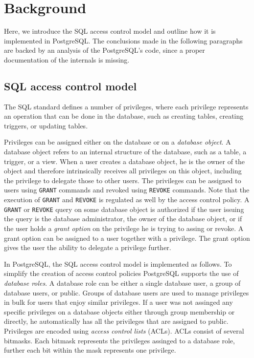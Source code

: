 \section{Background}

Here, we introduce the SQL access control model and outline how it is implemented in PostgreSQL.
%
The conclusions made in the following paragraphs are backed by an analysis of the  PostgreSQL's code, since a proper documentation of the internals is missing.

\subsection{SQL access control model}

The SQL standard defines a number of privileges, where each privilege represents an operation that can be done in the database, such as creating tables, creating triggers, or updating tables.

Privileges can be assigned either on the database or on a \emph{database object}.
%
A database object refers to an internal structure of the database, such as a table, a trigger, or a view. 
%
When a user creates a database object, he is the owner of the object and therefore intrinsically receives all privileges on this object, including the privilege to delegate those to other users.
%
The privileges can be assigned to users using \texttt{GRANT} commands and revoked using \texttt{REVOKE} commands.
%
Note that the execution of  \texttt{GRANT} and \texttt{REVOKE} is regulated as well by the access control policy. 
%
A \texttt{GRANT} or \texttt{REVOKE} query on some database object is authorized if the user issuing the query is the database administrator, the owner of the database object, or if the user holds a \emph{grant option} on the privilege he is trying to assing or revoke.
%
A grant option can be assigned to a user together with a privilege.
%
The grant option gives the user the ability to delegate a privilege further.

In PostgreSQL, the SQL access control model is implemented as follows.
%
To simplify the creation of access control policies PostgreSQL supports the use of \emph{database roles}.
%
A database role can be either a single database user, a group of database users, or public. 
%
Groups of database users are used to manage privileges in bulk for users that enjoy similar privileges.
%
If a user was not assinged any specific privileges on a database objects either through group membership or directly, he automatically has all the privileges that are assigned to public.
%
Privileges are encoded using \emph{access control lists} (ACLs).
%
ACLs consist of several bitmasks.
%
Each bitmask represents the privileges assinged to a database role, further each bit within the mask represents one privilege.
%

